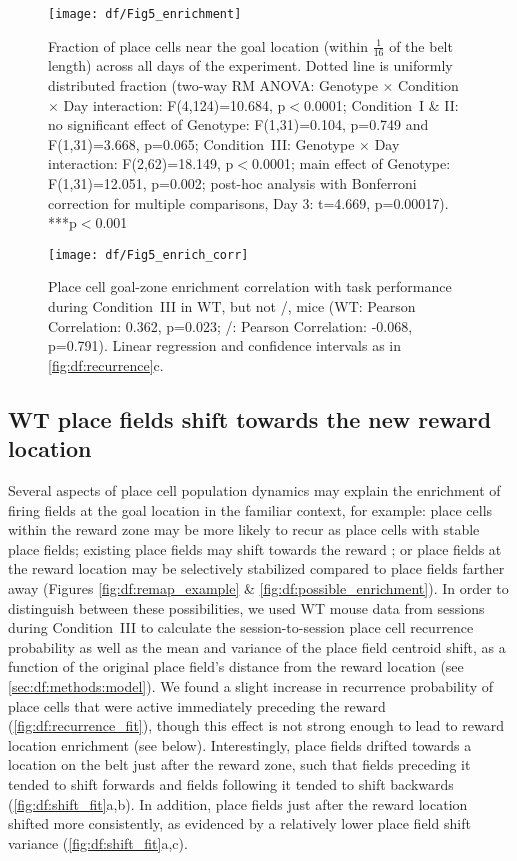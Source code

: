 \begin{figure}
	\centering
	\texttt{[image: df/Fig5\_enrichment]}
	\caption[Fraction of place cells near the goal location across all days of the experiment]{Fraction of place cells near the goal location (within $\frac{1}{16}$ of the belt length) across all days of the experiment.
	Dotted line is uniformly distributed fraction (two-way RM ANOVA: Genotype $\times$ Condition $\times$ Day interaction: F(4,124)=10.684, p$<$0.0001; Condition~I \& II: no significant effect of Genotype: F(1,31)=0.104, p=0.749 and F(1,31)=3.668, p=0.065; Condition~III: Genotype $\times$ Day interaction: F(2,62)=18.149, p$<$0.0001; main effect of Genotype: F(1,31)=12.051, p=0.002; post-hoc analysis with Bonferroni correction for multiple comparisons, Day 3: t=4.669, p=0.00017). ***p$<$0.001}
	\label{fig:df:enrichment}
\end{figure}

\begin{figure}
	\centering
	\texttt{[image: df/Fig5\_enrich\_corr]}
	\caption[Correlation of place cell goal-zone enrichment with task performance during Condition~III]{Place cell goal-zone enrichment correlation with task performance during Condition~III in WT, but not \df/, mice (WT: Pearson Correlation: 0.362, p=0.023; \df/: Pearson Correlation: -0.068, p=0.791). Linear regression and confidence intervals as in \autoref{fig:df:recurrence}c.}
	\label{fig:df:enrich_corr}
\end{figure}

\subsection{WT place fields shift towards the new reward location}
Several aspects of place cell population dynamics may explain the enrichment of firing fields at the goal location in the familiar context, for example: place cells within the reward zone may be more likely to recur as place cells with stable place fields; existing place fields may shift towards the reward \citep{Lee2006a}; or place fields at the reward location may be selectively stabilized compared to place fields farther away (Figures \ref{fig:df:remap_example} \& \ref{fig:df:possible_enrichment}).  In order to distinguish between these possibilities, we used WT mouse data from sessions during Condition~III to calculate the session-to-session place cell recurrence probability as well as the mean and variance of the place field centroid shift, as a function of the original place field's distance from the reward location (see \autoref{sec:df:methods:model}). We found a slight increase in recurrence probability of place cells that were active immediately preceding the reward (\autoref{fig:df:recurrence_fit}), though this effect is not strong enough to lead to reward location enrichment (see below). Interestingly, place fields drifted towards a location on the belt just after the reward zone, such that fields preceding it tended to shift forwards and fields following it tended to shift backwards (\autoref{fig:df:shift_fit}a,b). In addition, place fields just after the reward location shifted more consistently, as evidenced by a relatively lower place field shift variance (\autoref{fig:df:shift_fit}a,c). 

